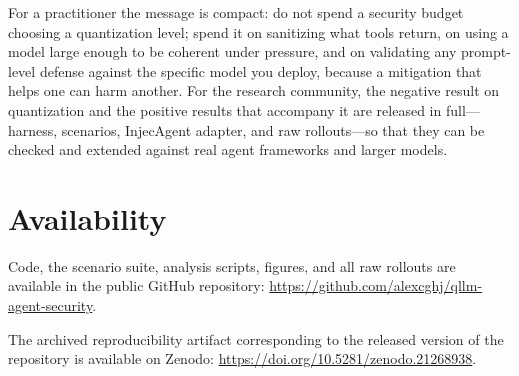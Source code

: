 \documentclass[11pt]{article}
\begin{document}
For a practitioner the message is compact: do not spend a security budget
choosing a quantization level; spend it on sanitizing what tools return, on
using a model large enough to be coherent under pressure, and on validating
any prompt-level defense against the specific model you deploy, because a
mitigation that helps one can harm another. For the research community, the
negative result on quantization and the positive results that accompany it
are released in full---harness, scenarios, InjecAgent adapter, and raw
rollouts---so that they can be checked and extended against real agent
frameworks and larger models.

\section*{Availability}

Code, the scenario suite, analysis scripts, figures, and all raw rollouts are available in the public GitHub repository:
\url{https://github.com/alexcghj/qllm-agent-security}.

The archived reproducibility artifact corresponding to the released version of the repository is available on Zenodo:
\url{https://doi.org/10.5281/zenodo.21268938}.

\clearpage
\end{document}
